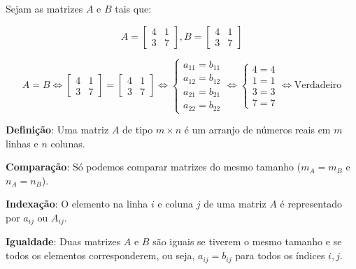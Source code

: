 \begin{center}
    Sejam as matrizes $A$ e $B$ tais que:
\end{center}
\[
    A =
    \begin{bmatrix}
        4 & 1 \\
        3 & 7
    \end{bmatrix},
    B =
    \begin{bmatrix}
        4 & 1 \\
        3 & 7
    \end{bmatrix}
\]

\begin{equation}
    A = B \Leftrightarrow
    \begin{bmatrix}
        4 & 1 \\
        3 & 7
    \end{bmatrix} =
    \begin{bmatrix}
        4 & 1 \\
        3 & 7
    \end{bmatrix} \Leftrightarrow
    \begin{cases}
        a_{11} = b_{11} \\
        a_{12} = b_{12} \\
        a_{21} = b_{21} \\
        a_{22} = b_{22}
    \end{cases} \Leftrightarrow
    \begin{cases}
        4 = 4 \\
        1 = 1 \\
        3 = 3 \\
        7 = 7
    \end{cases} \Leftrightarrow \text{Verdadeiro}
\end{equation}

\begin{infoclean}[title = Notas, center, center title]
    \textbf{Definição}: Uma matriz \( A \) de tipo \( m \times n \) é um arranjo de números reais em \( m \) linhas e \( n \) colunas.

    \textbf{Comparação}: Só podemos comparar matrizes do mesmo tamanho (\( m_A = m_B \) e \( n_A = n_B \)).

    \textbf{Indexação}: O elemento na linha \( i \) e coluna \( j \) de uma matriz \( A \) é representado por \( a_{ij} \) ou \( A_{ij} \).

    \textbf{Igualdade}: Duas matrizes \( A \) e \( B \) são iguais se tiverem o mesmo tamanho e se todos os elementos corresponderem, ou seja, \( a_{ij} = b_{ij} \) para todos os índices \( i, j \).
\end{infoclean}


